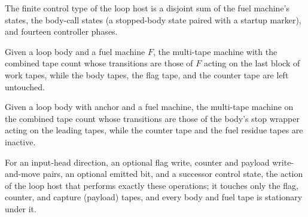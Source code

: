 \begin{definition}
\label{Turing.FinTM.LoopHostState}
\leanok
{}
The finite control type of the loop host is a disjoint sum of the fuel machine's states,
the body-call states (a stopped-body state paired with a startup marker), and fourteen
controller phases.
\end{definition}

\begin{definition}
\label{Turing.FinTM.loopFuelSource}
\leanok
{}
Given a loop body and a fuel machine $F$, the multi-tape machine with the combined tape
count whose transitions are those of $F$ acting on the last block of work tapes, while
the body tapes, the flag tape, and the counter tape are left untouched.
\end{definition}

\begin{definition}
\label{Turing.FinTM.loopBodySource}
\leanok
{}
Given a loop body with anchor and a fuel machine, the multi-tape machine on the combined
tape count whose transitions are those of the body's stop wrapper acting on the leading
tapes, while the counter tape and the fuel residue tapes are inactive.
\end{definition}

\begin{definition}
\label{Turing.FinTM.loopControlAction}
\leanok
{}
For an input-head direction, an optional flag write, counter and payload write-and-move
pairs, an optional emitted bit, and a successor control state, the action of the loop
host that performs exactly these operations; it touches only the flag, counter, and
capture (payload) tapes, and every body and fuel tape is stationary under it.
\end{definition}

